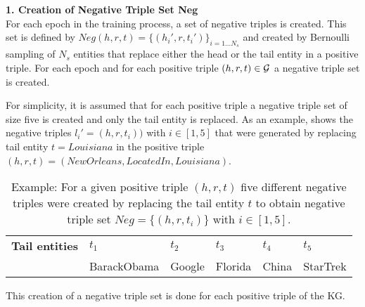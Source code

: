 \textbf{1. Creation of Negative Triple Set Neg}\\
For each epoch in the training process, a set of negative triples is created.
This set is defined by $Neg(h,r,t)=\{(h_i',r,t_i')\}_{i=1\dots N_s}$ and created by Bernoulli sampling of $N_s$ entities that replace either the head or the tail entity in a positive triple.
For each epoch and for each positive triple $(h,r,t) \in \mathcal{G}$ a negative triple set is created.

For simplicity, it is assumed that for each positive triple a negative triple set of size five is created and only the tail entity is replaced.
As an example,  shows the negative triples $l_i' = (h, r, t_i))$ with $i \in [1,5]$ that were generated by replacing tail entity $t = Louisiana$ in the positive triple $(h, r, t) = (NewOrleans, LocatedIn, Louisiana)$. 
\begin{table}[H]
    \centering
    \begin{tabular}{llllll}
        \toprule
        
        \textbf{Tail entities}
        & \textbf{$t_1$} & \textbf{$t_2$} & \textbf{$t_3$} & \textbf{$t_4$} & \textbf{$t_5$} \\
        
        & BarackObama 
        & Google  
        & Florida 
        & China 
        & StarTrek\\

        \bottomrule
    \end{tabular}
    \caption{Example: For a given positive triple $(h,r,t)$ five different negative triples were created by replacing the tail entity $t$ to obtain negative triple set $Neg = \{(h,r,t_i)\}$ with $i \in [1,5]$.}
\label{tab:neg_example}
\end{table}
This creation of a negative triple set is done for each positive triple of the KG.